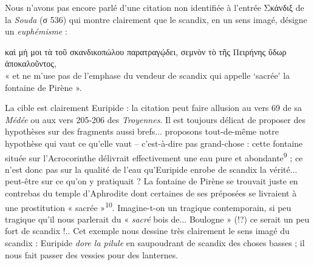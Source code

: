 \documentclass[12pt]{book}%
\newcommand{\italique}[1]{\textit{#1}}%
\newcommand{\citComm}[1]{\begin{quoting}[vskip=0pt] #1 \end{quoting}}%
\newcommand{\marqueur}[1]{\textsuperscript{#1}}%
\newenvironment{groupe}{%
\pstart%
\ledgroup%
}{%
\pend %
}%
\begin{document}
\begin{pages}
\begin{Leftside}
\begin{groupe}
{{Nous n'avons pas encore parlé d'une citation non identifiée à l'entrée Σκάνδιξ de la \italique{Souda} (σ 536) qui montre clairement que le scandix, en un sens imagé, désigne un \italique{euphémisme} :
\citComm{καὶ μή μοι τὰ τοῦ σκανδικοπώλου παρατραγῴδει, σεμνὸν τὸ τῆς Πειρήνης ὕδωρ ἀποκαλοῦντος,\\
« et ne m'use pas de l'emphase du vendeur de scandix qui appelle `sacrée' la fontaine de Pirène ».}%
La cible est clairement Euripide : la citation peut faire allusion au vers 69 de sa \italique{Médée} ou aux vers 205-206 des \italique{Troyennes}. Il est toujours délicat de proposer des hypothèses sur des fragments aussi brefs... proposons tout-de-même notre hypothèse qui vaut ce qu'elle vaut – c'est-à-dire pas grand-chose : cette fontaine située sur l'Acrocorinthe délivrait effectivement une eau pure et abondante\marqueur{9} ; ce n'est donc pas sur la qualité de l'eau qu'Euripide enrobe de scandix la vérité... peut-être sur ce qu'on y pratiquait ? La fontaine de Pirène se trouvait juste en contrebas du temple d'Aphrodite dont certaines de ses préposées se livraient à une prostitution « sacrée »\marqueur{10}. Imagine-t-on un tragique contemporain, si peu tragique qu'il nous parlerait du « \italique{sacré} bois de... Boulogne » (!?) ce serait un peu fort de scandix !.. Cet exemple nous dessine très clairement le sens imagé du scandix : Euripide \italique{dore la pilule} en saupoudrant de scandix des choses basses ; il nous fait passer des vessies pour des lanternes.

}}
\end{groupe}
\end{Leftside}
\end{pages}
\end{document}
